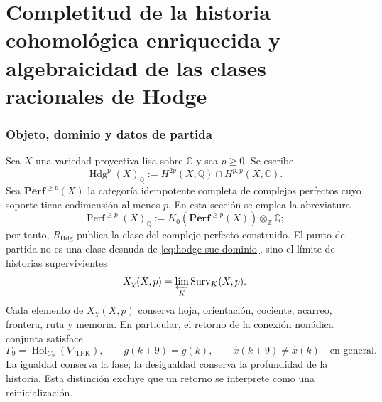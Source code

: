 %

\ifdefined\HMTSucesoraStructureTrace
\fi

\chapter{Completitud de la historia cohomológica enriquecida y algebraicidad de las clases racionales de Hodge}

\subsection*{Objeto, dominio y datos de partida}

Sea \(X\) una variedad proyectiva lisa sobre \(\mathbb C\) y sea
\(p\geq0\). Se escribe
\begin{equation}\label{eq:hodge-suc-dominio}
 \operatorname{Hdg}^{p}(X)_{\mathbb Q}
 :=H^{2p}(X,\mathbb Q)
   \cap H^{p,p}(X,\mathbb C).
\end{equation}
Sea \(\mathbf{Perf}^{\geq p}(X)\) la categoría idempotente completa de
complejos perfectos cuyo soporte tiene codimensión al menos \(p\). En esta
sección se emplea la abreviatura
\[
 \operatorname{Perf}^{\geq p}(X)_{\mathbb Q}
 :=K_0\!\left(\mathbf{Perf}^{\geq p}(X)\right)
   \otimes_{\mathbb Z}\mathbb Q;
\]
por tanto, \(R_{\mathrm{Hdg}}\) publica la clase del complejo perfecto
construido. El punto de partida no es una clase desnuda de
\eqref{eq:hodge-suc-dominio}, sino el límite de historias supervivientes
\begin{equation}\label{eq:hodge-suc-xchi}
 X_{\chi}(X,p)
 =\varprojlim_{K}\operatorname{Surv}_{K}(X,p).
\end{equation}
Cada elemento de \(X_{\chi}(X,p)\) conserva hoja, orientación, cociente,
acarreo, frontera, ruta y memoria. En particular, el retorno de la conexión
nonádica conjunta satisface
\begin{equation}\label{eq:hodge-suc-retorno}
 \Gamma _9=\operatorname{Hol}_{C_9}(\nabla_{\mathrm{TPK}}),
 \qquad g(k+9)=g(k),
 \qquad \widehat x(k+9)\neq\widehat x(k)
 \quad\text{en general}.
\end{equation}
La igualdad conserva la fase; la desigualdad conserva la profundidad de la
historia. Esta distinción excluye que un retorno se interprete como una
reinicialización.

